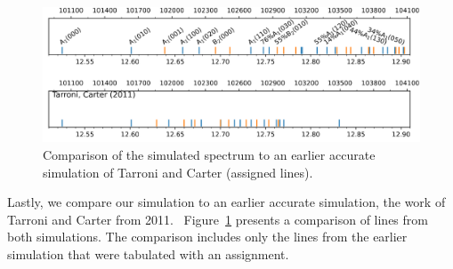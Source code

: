 \documentclass[12pt,a4paper,prb,aps,superscriptaddress]{revtex4}
\begin{document}
\begin{figure}
    \includegraphics[width=16 cm]{figures/sim_vs_TarroniCarter}
    \caption{
        Comparison of the simulated spectrum to an earlier accurate simulation
        of Tarroni and Carter (assigned lines).~\cite{tarroni:O3:2011}
    }
    \label{fig:sim_vs_tarronicarter}
\end{figure}

Lastly, we compare our simulation to an earlier accurate simulation, the work
of Tarroni and Carter from 2011.~\cite{tarroni:O3:2011}
Figure~\ref{fig:sim_vs_tarronicarter} presents a comparison of lines from both
simulations. The comparison includes only the lines from the earlier
simulation that were tabulated with an assignment. 
\end{document}
